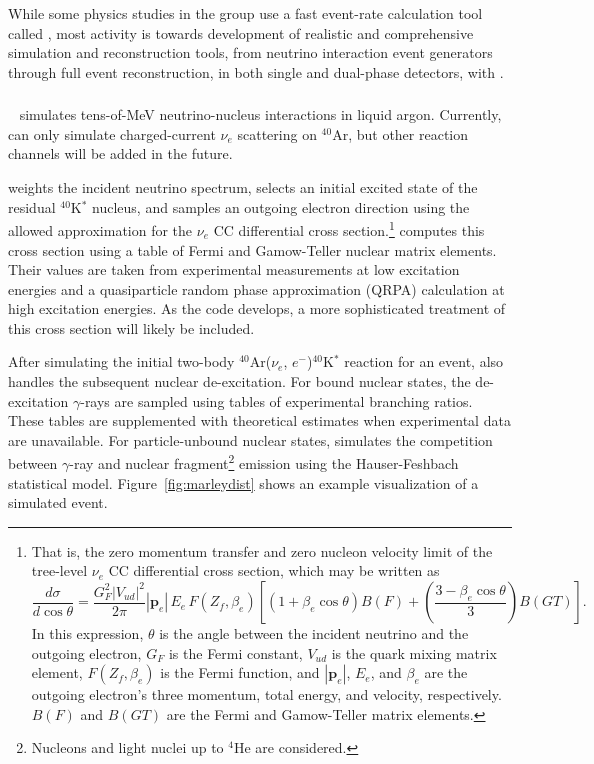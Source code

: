 While
some physics studies in the  group
 use a fast event-rate calculation tool called , most
 activity is towards development of realistic and comprehensive
 simulation and reconstruction tools, from neutrino interaction event
 generators through full event reconstruction, in both single and
 dual-phase detectors, with .


\subsubsection{}

~\cite{marley} simulates tens-of-MeV
neutrino-nucleus interactions in liquid argon. Currently,  can only
simulate charged-current $\nu_e$ scattering on $^{40}$Ar, but other
reaction channels will be added in the future.

 weights the incident neutrino spectrum, selects an initial excited state
of the residual $^{40}$K$^*$ nucleus, and samples an outgoing electron
direction using the allowed approximation for the $\nu_e$ CC differential cross
section.\footnote{That is, the zero momentum transfer and zero nucleon velocity
limit of the tree-level $\nu_e$ CC differential cross section, which may be
written as
\[
\frac{d\sigma}{d\cos \theta}
= \frac{G_F^2 |V_{ud}|^2}{2\pi} |\mathbf{p}_e|\, E_e \,F(Z_f, \beta_e)
\left[(1+\beta_e \cos\theta)B(F) + \left(\frac{3 - \beta_e \cos\theta}
{3}\right)B(GT)\right].
\]
In this expression, $\theta$ is the angle between the incident neutrino and the
outgoing electron, $G_F$ is the Fermi constant, $V_{ud}$ is the quark mixing
matrix element, $F(Z_f, \beta_e)$ is the Fermi function, and $|\mathbf{p}_e|$,
$E_e$, and $\beta_e$ are the outgoing electron's three momentum, total energy,
and velocity, respectively. $B(F)$ and $B(GT)$ are the Fermi and Gamow-Teller
matrix elements.
}
 computes this cross section using a table of Fermi and Gamow-Teller
nuclear matrix elements. Their values are taken from experimental measurements
at low excitation energies and a quasiparticle random phase approximation
(QRPA) calculation at high excitation energies. As the code develops, a more
sophisticated treatment of this cross section will likely be included.

After simulating the initial two-body $^{40}${Ar}($\nu_e$,
$e^{-}$)$^{40}$K$^*$ reaction for an event, 
also handles the subsequent nuclear de-excitation. For bound nuclear
states, the de-excitation $\gamma$-rays are sampled using tables of
experimental branching ratios. These tables are supplemented with
theoretical estimates when experimental data are unavailable. For
particle-unbound nuclear states,  simulates the competition between
$\gamma$-ray and nuclear fragment\footnote{ Nucleons and light nuclei up to
$^{4}${He} are considered.} emission using the Hauser-Feshbach
statistical model.   Figure~\ref{fig:marleydist} shows an example
visualization of a simulated  event.

